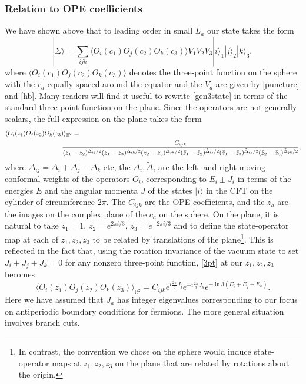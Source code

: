 \documentclass[12pt]{article}
\newcommand{\be}{\begin{equation}}
\newcommand{\ee}{\end{equation}}
\numberwithin{equation}{section}
\begin{document}
\subsubsection{Relation to OPE coefficients}

We have shown above that to leading order in small $L_a$ our state takes the form
\be \label{gen3state}
|\Sigma \rangle = \sum_{ijk}  \langle O_i(c_1) O_j(c_2) O_k(c_3) \rangle V_1 V_2 V_3  |i\rangle_1 |j\rangle_2 |k\rangle_3,
\ee
where $\langle O_i(c_1) O_j(c_2) O_k(c_3) \rangle$ denotes the three-point function on the sphere with the $c_a$ equally spaced around the equator and the $V_a$ are given by \eqref{puncture} and \eqref{hb}.  Many readers will find it useful to rewrite \eqref{gen3state} in terms of the standard three-point function on the plane.  Since the operators are not generally scalars, the full expression on the plane takes the form
\begin{align}
\label{3pt}
\langle O_i(z_1) O_j(z_2) O_k(z_3) \rangle_{\mathbb{R}^2} = \hspace{12cm}  \cr  \frac{C_{ijk}}{(z_1-z_2)^{\Delta_{ij}/2} (z_1  -z_3)^{\Delta_{ik}/2} (z_2  -z_3)^{\Delta_{jk}/2} (\bar z_1- \bar z_2)^{\tilde  \Delta_{ij}/2} (\bar z_1  - \bar z_3)^{\tilde \Delta_{ik}/2} (\bar z_2  -\bar z_3)^{\tilde \Delta_{jk}/2}} ,
\end{align}
%
where $\Delta_{ij} = \Delta_i + \Delta_j - \Delta_k$ etc, the $\Delta_i, \tilde \Delta_i$ are the left- and right-moving conformal weights of the operators $O_i$, corresponding to $E_i \pm J_i$ in terms of the energies $E$ and the angular momenta $J$ of the states $|i\rangle$ in the CFT on the cylinder of circumference $2\pi$.  The $C_{ijk}$ are the OPE coefficients, and the $z_a$ are the images on the complex plane of the $c_a$ on the sphere.  On the plane, it is natural to take $z_1 = 1$, $z_2 = e^{2\pi i/3}$, $z_3 = e^{-2\pi i/3}$ and to define the state-operator map at each of $z_1, z_2, z_3$ to be related by translations of the plane\footnote{In contrast, the convention we chose on the sphere would induce state-operator maps at $z_1,z_2,z_3$ on the plane that are related by rotations about the origin.}.  This is reflected in the fact that, using the rotation invariance of the vacuum state to set $J_i +J_j + J_k=0$ for any nonzero three-point function,  \eqref{3pt} at our $z_1,z_2,z_3$ becomes
\be
\label{3pt}
\langle O_i(z_1) O_j(z_2) O_k(z_3) \rangle_{\mathbb{R}^2} = C_{ijk} e^{i \frac{2\pi}{3} J_j} e^{-i \frac{2\pi}{3} J_k} e^{-\ln 3 \left( E_i + E_j + E_k\right)}.
\ee
Here we have assumed that $J_a$ has integer eigenvalues corresponding to our focus on antiperiodic boundary conditions for fermions.  The more general situation involves branch cuts.
\end{document}
